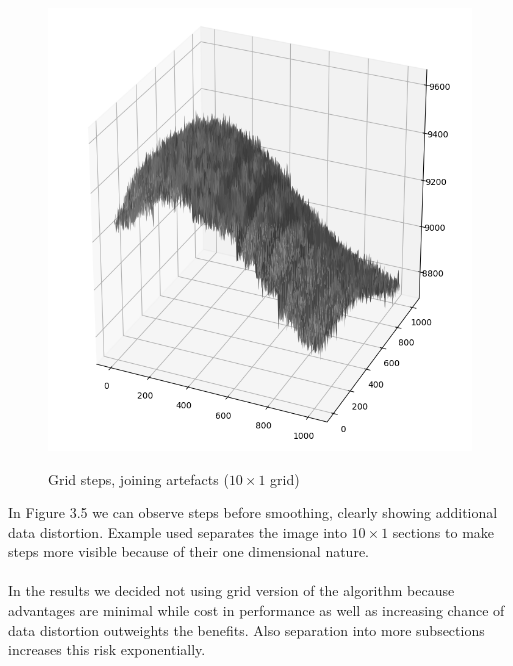 \documentclass[12pt, a4paper, oneside]{book}
\begin{document}
\begin{figure}[H]
    \begin{center}
        \includegraphics[scale=0.50]{images/grid_steps.png}
        \label{img:grid_steps}
        \caption{Grid steps, joining artefacts ($10 \times 1$ grid)}
    \end{center}
\end{figure}

In Figure 3.5 we can observe steps before smoothing, clearly showing additional data distortion.
Example used separates the image into $10 \times 1$ sections to make steps more visible because of their one dimensional nature.\\
\\
In the results we decided not using grid version of the algorithm because advantages are minimal while cost in performance as well as increasing chance of data distortion outweights the benefits.
Also separation into more subsections increases this risk exponentially.
\end{document}
